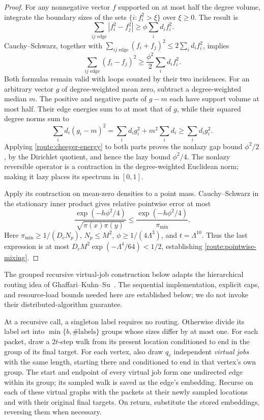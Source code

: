 \begin{proof}
For any nonnegative vector $f$ supported on at most half the degree
volume, integrate the boundary sizes of the sets
$\{i:f_i^2>\xi\}$ over $\xi\ge0$.  The result is
\[
 \sum_{ij\text{ edge}}|f_i^2-f_j^2|
       \ge\phi\sum_i d_i f_i^2.
\]
Cauchy--Schwarz, together with
$\sum_{ij\text{ edge}}(f_i+f_j)^2\le2\sum_i d_i f_i^2$, implies
\begin{equation}\label{route:cheeger-energy}
 \sum_{ij\text{ edge}}(f_i-f_j)^2
       \ge\frac{\phi^2}{2}\sum_i d_i f_i^2.
\end{equation}
Both formulas remain valid with loops counted by their two incidences.
For an arbitrary vector $g$ of degree-weighted mean zero, subtract a
degree-weighted median $m$.  The positive and negative parts of
$g-m$ each have support volume at most half.  Their edge energies
sum to at most that of $g$, while their squared degree norms sum to
\[
 \sum_i d_i(g_i-m)^2
       =\sum_i d_i g_i^2+m^2\sum_i d_i
       \ge\sum_i d_i g_i^2.
\]
Applying \eqref{route:cheeger-energy} to both parts proves the
nonlazy gap bound $\phi^2/2$, by the Dirichlet quotient, and hence
the lazy bound $\phi^2/4$.  The nonlazy reversible operator is a
contraction in the degree-weighted Euclidean norm; making it lazy
places its spectrum in $[0,1]$.

Apply its contraction on mean-zero densities to a point mass.
Cauchy--Schwarz in the stationary inner product gives relative
pointwise error at most
\[
 \frac{\exp(-h\phi^2/4)}{\sqrt{\pi(x)\pi(y)}}
       \le\frac{\exp(-h\phi^2/4)}{\pi_{\min}}.
\]
Here $\pi_{\min}\ge1/(D_cN_p)$, $N_p\le M^2$,
$\phi\ge1/(4\Lambda^3)$, and $t=\Lambda^{10}$.
Thus the last expression is at most
$D_cM^2\exp(-\Lambda^4/64)<1/2$, establishing
\eqref{route:pointwise-mixing}.
\end{proof}

The grouped recursive virtual-job construction below adapts the
hierarchical routing idea of Ghaffari--Kuhn--Su~\cite[Lemma~3.1]{GhaffariKuhnSu2017}.
The sequential implementation, explicit caps, and resource-load bounds
needed here are established below; we do not invoke their distributed-algorithm
guarantee.

At a recursive call, a singleton label requires no routing.  Otherwise
divide its label set into $\min\{b,\#\text{labels}\}$ groups whose
sizes differ by at most one.  For each packet, draw a $2t$-step walk
from its present location conditioned to end in the group of its final
target.  For each vertex, also draw $q_v$ independent \emph{virtual
jobs} with the same length, starting there and conditioned to end in
that vertex's own group.  The start and endpoint of every virtual job
form one undirected edge within its group; its sampled walk is saved
as the edge's embedding.  Recurse on each of these virtual graphs
with the packets at their newly sampled locations and with their
original final targets.  On return, substitute the stored embeddings,
reversing them when necessary.


